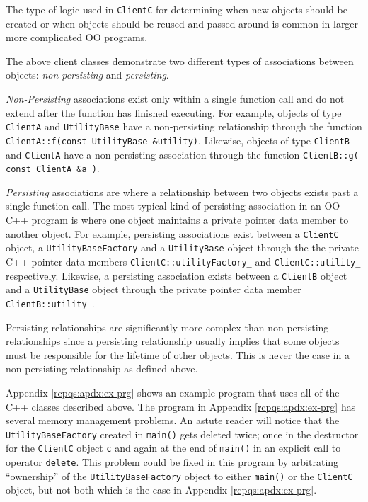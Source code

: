 \documentclass[pdf,ps2pdf,11pt]{SANDreport}
\begin{document}
The type of logic used in {}\texttt{ClientC} for determining when new
objects should be created or when objects should be reused and passed
around is common in larger more complicated OO programs.

The above client classes demonstrate two different types of
associations between objects: {}\textit{non-persisting} and
{}\textit{persisting}.

{}\textit{Non-Persisting}\label{rcp:non-persisting-defined}
associations exist only within a single function call and do not
extend after the function has finished executing.  For example,
objects of type {}\texttt{Client\-A} and {}\texttt{Utility\-Base} have
a non-persisting relationship through the function
{}\texttt{ClientA\-::f(const UtilityBase \&utility)}.  Likewise,
objects of type {}\texttt{Client\-B} and {}\texttt{Client\-A} have a
non-persisting association through the function
{}\texttt{ClientB\-::g( const ClientA
\&a )}.

{}\textit{Persisting}\label{rcp:persisting-defined} associations are
where a relationship between two objects exists past a single function
call.  The most typical kind of persisting association in an OO C++
program is where one object maintains a private pointer data member to
another object.  For example, persisting associations exist between a
{}\texttt{ClientC} object, a {}\texttt{Utility\-Base\-Factory} and a
{}\texttt{Utility\-Base} object through the the private C++ pointer
data members {}\texttt{ClientC\-::utility\-Factory\_} and
{}\texttt{ClientC\-::utility\_} respectively.  Likewise, a persisting
association exists between a {}\texttt{ClientB} object and a
{}\texttt{Utility\-Base} object through the private pointer data
member {}\texttt{ClientB\-::utility\_}.

Persisting relationships are significantly more complex than
non-persisting relationships since a persisting relationship usually
implies that some objects must be responsible for the lifetime of
other objects.  This is never the case in a non-persisting relationship as
defined above.

Appendix {}\ref{rcpqs:apdx:ex-prg} shows an example program that uses
all of the C++ classes described above.  The program in Appendix
{}\ref{rcpqs:apdx:ex-prg} has several memory management problems. An
astute reader will notice that the {}\texttt{Utility\-Base\-Factory}
created in {}\texttt{main()} gets deleted twice; once in the
destructor for the {}\texttt{ClientC} object {}\texttt{c} and again at
the end of {}\texttt{main()} in an explicit call to operator
{}\texttt{delete}.  This problem could be fixed in this program by
arbitrating ``ownership'' of the {}\texttt{Utility\-Base\-Factory}
object to either {}\texttt{main()} or the {}\texttt{ClientC} object,
but not both which is the case in Appendix {}\ref{rcpqs:apdx:ex-prg}.
\end{document}
